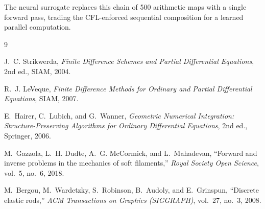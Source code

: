 \documentclass[11pt]{article}
\begin{document}
\noindent
The neural surrogate replaces this chain of 500 arithmetic maps with a single forward pass, trading the CFL-enforced sequential composition for a learned parallel computation.

\begin{thebibliography}{9}

J.~C. Strikwerda,
\textit{Finite Difference Schemes and Partial Differential Equations},
2nd ed., SIAM, 2004.

R.~J. LeVeque,
\textit{Finite Difference Methods for Ordinary and Partial Differential Equations},
SIAM, 2007.

E.~Hairer, C.~Lubich, and G.~Wanner,
\textit{Geometric Numerical Integration: Structure-Preserving Algorithms for Ordinary Differential Equations},
2nd ed., Springer, 2006.

M.~Gazzola, L.~H. Dudte, A.~G. McCormick, and L.~Mahadevan,
``Forward and inverse problems in the mechanics of soft filaments,''
\textit{Royal Society Open Science}, vol.~5, no.~6, 2018.

M.~Bergou, M.~Wardetzky, S.~Robinson, B.~Audoly, and E.~Grinspun,
``Discrete elastic rods,''
\textit{ACM Transactions on Graphics (SIGGRAPH)}, vol.~27, no.~3, 2008.

\end{thebibliography}
\end{document}
